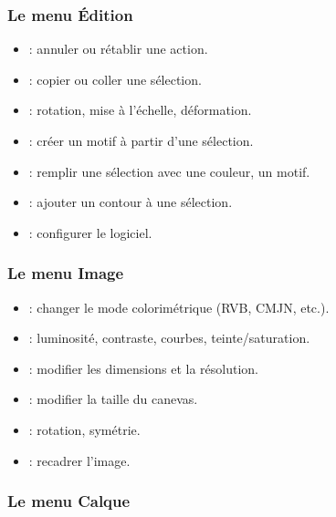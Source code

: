 \subsubsection{Le menu Édition}

\begin{itemize}
    \item {} : annuler ou rétablir une action.
    \item {} : copier ou coller une sélection.
    \item {} : rotation, mise à l'échelle, déformation.
    \item {} : créer un motif à partir d'une sélection.
    \item {} : remplir une sélection avec une couleur, un motif.
    \item {} : ajouter un contour à une sélection.
    \item {} : configurer le logiciel.
\end{itemize}

\subsubsection{Le menu Image}

\begin{itemize}
    \item {} : changer le mode colorimétrique (RVB, CMJN, etc.).
    \item {} : luminosité, contraste, courbes, teinte/saturation.
    \item {} : modifier les dimensions et la résolution.
    \item {} : modifier la taille du canevas.
    \item {} : rotation, symétrie.
    \item {} : recadrer l'image.
\end{itemize}

\subsubsection{Le menu Calque}

